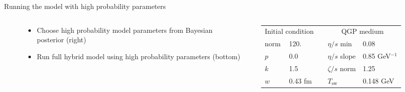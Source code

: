 \documentclass[xcolor=dvipsnames, aspectratio=169]{beamer}
\begin{document}
\begin{frame}[plain]
\end{frame}

\begin{frame}[t]{Running the model with high probability parameters}
    \centering \vspace{0.4 cm}
    \begin{columns}[T]
        \begin{column}{0.05\textwidth}
        \end{column}
        \begin{column}{0.4\textwidth}
            \scriptsize
            \begin{itemize}
                \item Choose high probability model parameters 
                      from Bayesian\\ posterior (right)
                \smallskip
                \item Run full hybrid model using high probability 
                      parameters (bottom)
            \end{itemize}
        \end{column}
        \begin{column}{0.46\textwidth}
            \scriptsize
            \begin{tabular}{lllll}
                \multicolumn{2}{c}{Initial condition} & & 
                    \multicolumn{2}{c}{QGP medium} \\
                \noalign{\smallskip}\hline\noalign{\medskip}
                norm & 120.          &&  $\eta/s$ min   & 0.08       \\
                $p$  & 0.0           &&  $\eta/s$ slope & 0.85 GeV$^{-1}$   \\
                $k$  & 1.5           &&  $\zeta/s$ norm & 1.25       \\
                $w$  & 0.43 fm       &&  $T_\text{sw}$  & 0.148 GeV  \\
            \end{tabular}
        \end{column}
        \begin{column}{0.05\textwidth}
        \end{column}
    \end{columns}
    \vspace{0.5 cm}

\end{frame}
\end{document}
